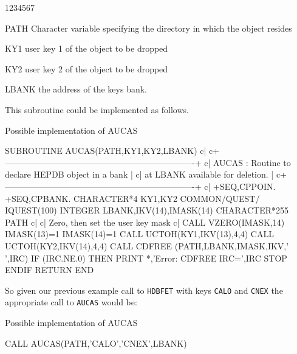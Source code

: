 \begin{DLtt}{1234567}
\item[PATH]Character variable specifying the directory in which the object resides
\item[KY1]user key 1 of the object to be dropped
\item[KY2]user key 2 of the object to be dropped
\item[LBANK]the address of the keys bank.
\end{DLtt}

This subroutine could be implemented as follows.
%
\begin{XMPt}{Possible implementation of AUCAS}

      SUBROUTINE AUCAS(PATH,KY1,KY2,LBANK)
c|
c+-------------------------------------------------------------------+
c|   AUCAS      : Routine to declare  HEPDB object in a bank         |
c|                at LBANK available for deletion.                   |
c+-------------------------------------------------------------------+
c|
+SEQ,CPPOIN.
+SEQ,CPBANK.
      CHARACTER*4       KY1,KY2
      COMMON/QUEST/     IQUEST(100)
      INTEGER           LBANK,IKV(14),IMASK(14)
      CHARACTER*255     PATH
c|
c|    Zero, then set the user key mask
c|
      CALL VZERO(IMASK,14)
      IMASK(13)=1
      IMASK(14)=1
      CALL UCTOH(KY1,IKV(13),4,4)
      CALL UCTOH(KY2,IKV(14),4,4)
      CALL CDFREE (PATH,LBANK,IMASK,IKV,' ',IRC)
      IF (IRC.NE.0) THEN
          PRINT *,'Error: CDFREE IRC=',IRC
          STOP
      ENDIF
      RETURN
      END

\end{XMPt}
So given our previous example call to {\tt HDBFET} with keys {\tt CALO} and {\tt CNEX}
the appropriate call to {\tt AUCAS} would be:
%
\begin{XMPt}{Possible implementation of AUCAS}

      CALL AUCAS(PATH,'CALO','CNEX',LBANK)

\end{XMPt}
%
%
%

